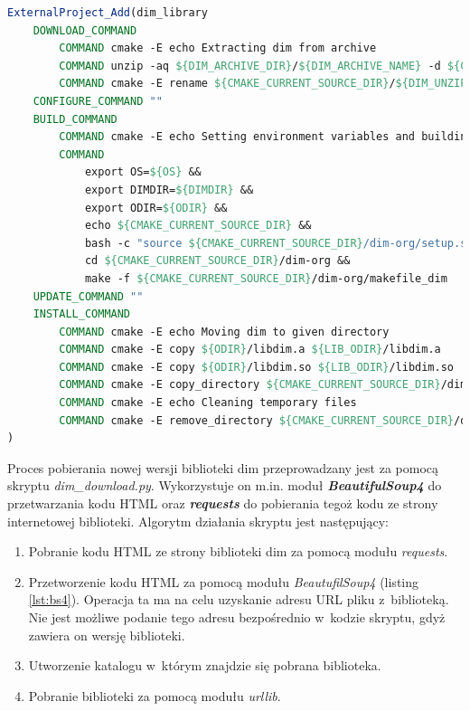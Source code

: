 \begin{lstlisting}[language=cmake, caption={Fragment pliku \textit{CMakeLists.txt} przeznaczonego do konfiguracji procesu budowania biblioteki \gls*{dim}. Widoczne zastosowanie funkcjonalności \textit{ExternalProject} pozwalającej na wykorzystanie plików \textit{Makefile} (makefile\_dim) dostarczonych przez autorów biblioteki.}, label={lst:dimexternal}]
ExternalProject_Add(dim_library
    DOWNLOAD_COMMAND 
        COMMAND cmake -E echo Extracting dim from archive
        COMMAND unzip -aq ${DIM_ARCHIVE_DIR}/${DIM_ARCHIVE_NAME} -d ${CMAKE_CURRENT_SOURCE_DIR}
        COMMAND cmake -E rename ${CMAKE_CURRENT_SOURCE_DIR}/${DIM_UNZIP_OUTPUT_DIRECTORY} ${CMAKE_CURRENT_SOURCE_DIR}/dim-org
    CONFIGURE_COMMAND ""
    BUILD_COMMAND 
        COMMAND cmake -E echo Setting environment variables and building
        COMMAND 
            export OS=${OS} && 
            export DIMDIR=${DIMDIR} && 
            export ODIR=${ODIR} && 
            echo ${CMAKE_CURRENT_SOURCE_DIR} && 
            bash -c "source ${CMAKE_CURRENT_SOURCE_DIR}/dim-org/setup.sh" && 
            cd ${CMAKE_CURRENT_SOURCE_DIR}/dim-org && 
            make -f ${CMAKE_CURRENT_SOURCE_DIR}/dim-org/makefile_dim
    UPDATE_COMMAND ""
    INSTALL_COMMAND 
        COMMAND cmake -E echo Moving dim to given directory
        COMMAND cmake -E copy ${ODIR}/libdim.a ${LIB_ODIR}/libdim.a
        COMMAND cmake -E copy ${ODIR}/libdim.so ${LIB_ODIR}/libdim.so
        COMMAND cmake -E copy_directory ${CMAKE_CURRENT_SOURCE_DIR}/dim-org/dim ${INCLUDE_ODIR}/dim
        COMMAND cmake -E echo Cleaning temporary files
        COMMAND cmake -E remove_directory ${CMAKE_CURRENT_SOURCE_DIR}/dim-org
)
\end{lstlisting}

Proces pobierania nowej wersji biblioteki \gls*{dim} przeprowadzany jest za pomocą skryptu \textit{dim\_download.py}. Wykorzystuje on m.in. moduł \textit{\textbf{BeautifulSoup4}} do przetwarzania kodu HTML oraz \textit{\textbf{requests}} \cite{RequestsPython} do pobierania tegoż kodu ze strony internetowej biblioteki. Algorytm działania skryptu jest następujący:
\begin{enumerate}
\item Pobranie kodu HTML ze strony biblioteki \gls*{dim} za pomocą modułu \textit{requests}.
\item Przetworzenie kodu HTML za pomocą modułu \textit{BeautufilSoup4} (listing \ref{lst:bs4}). Operacja ta ma na celu uzyskanie adresu URL pliku z~biblioteką. Nie jest możliwe podanie tego adresu bezpośrednio w~kodzie skryptu, gdyż zawiera on wersję biblioteki. 
\item Utworzenie katalogu w~którym znajdzie się pobrana biblioteka.
\item Pobranie biblioteki za pomocą modułu \textit{urllib}.
\end{enumerate}

